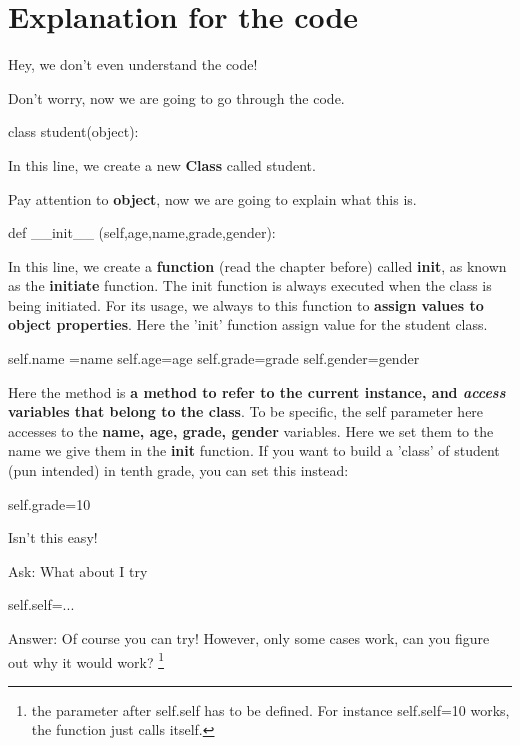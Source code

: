 \documentclass[12pt]{article}
\begin{document}
\section{Explanation for the code}
\begin{tcolorbox}[colback=blue!5!white,colframe=blue!50!white,title=Reader's Complain]
	Hey, we don't even understand the code!
\end{tcolorbox}
\par Don't worry, now we are going to go through the code.
\begin{python}
	class student(object):
\end{python}
\par In this line, we create a new \textbf{Class} called student.
\par Pay attention to \textbf{object}, now we are going to explain what this is.
\begin{python}
	def __init__ (self,age,name,grade,gender):
\end{python}
\par In this line, we create a \textbf{function} (read the chapter before) called \textbf{init}, 
as known as the \textbf{initiate} function.
The init function is always executed when the class is being initiated.
For its usage, we always to this function to \textbf{assign values to object properties}. Here the 'init' function assign value for the student class.
\begin{python}
	self.name =name
	self.age=age
	self.grade=grade
	self.gender=gender
\end{python}
Here the  method is \textbf{a method to refer to the current instance, and \textit{access} variables that belong to the class}.
To be specific, the self parameter here accesses to the \textbf{name, age, grade, gender} variables. Here we set them to the name we give them in the \textbf{init} function. If you want to build a 'class' of student (pun intended) in tenth grade, you can set this instead:
\begin{python}
	self.grade=10
\end{python}
Isn't this easy!
\begin{tcolorbox}[colback=red!5!white,colframe=white!50!red,title=Reader's Complain]
	Ask: What about I try
	\begin{python}
		self.self=...
	\end{python}
	Answer: Of course you can try! However, only some cases work, can you figure out why it would work? \footnote[1]{the parameter after self.self has to be defined. For instance self.self=10 works, the function just calls itself.}
\end{tcolorbox}
\end{document}
